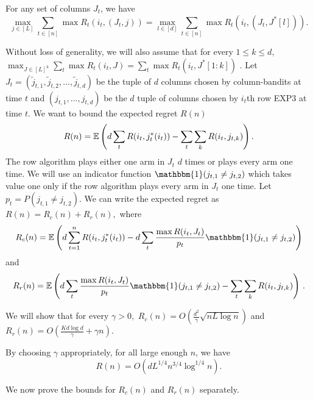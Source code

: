 \begin{lemma}
\label{thm:hott}
For any set of columns $J_t$, we have 
$$ \max_{j \in [L]} \sum_{t \in [n]} \max R_t(i_t, (J_t,j)) = \max_{l \in [d]} \sum_{t \in [n]} \max R_t(i_t, (J_t,J^*[l])).$$
\end{lemma}
Without loss of generality, we will also assume that for every $1 \leq k \leq d,$ $\max_{J \in [L]^k} \sum_t \max R_t(i_t,J) = \sum_t \max R_t(i_t,J^*[1:k])$ .  Let $J_t = (\tilde{j}_{t,1},\tilde{j}_{t,2},...,\tilde{j}_{t,d})$ be the tuple of $d$ columns chosen by column-bandits at time $t$ and $(j_{t,1},...,j_{t,d})$ be the $d$ tuple of columns chosen by $i_t$th row EXP3 at time $t.$ We want to bound the expected regret $R(n)$  
$$R(n) = \mathbb{E} \left( d\sum_{t } R(i_t,j^*_t(i_t)) - \sum_{t} \sum_k R(i_t,j_{t,k}) \right).$$
 The row algorithm plays either one arm in $J_t$ $d$ times or plays every arm one time. We will use an indicator function $\mathbbm{1}(j_{t,1} \neq j_{t,2})$ which takes value one only if the row algorithm  plays every arm in $J_t$ one time. Let $p_t = P(j_{t, 1} \neq j_{t, 2})$. We can write the expected regret as 
$R(n) = R_c(n) + R_r(n),$ where
\begin{align*}
  R_c(n) = \E \left( d\sum_{t = 1}^{n} R(i_t,j^*_t(i_t)) - d\sum_{t} \frac{\max R(i_t,J_t)}{p_t} \mathbbm{1}(j_{t,1} \neq j_{t,2})  \right)
\end{align*}
and
\begin{align*}
  R_r(n) = \E \left( d \sum_{t} \frac{ \max R(i_t,J_t)}{p_t} \mathbbm{1}(j_{t,1} \neq j_{t,2}) - \sum_{t} \sum_k R(i_t,j_{t,k}) \right)\,.
\end{align*}
  
We will show that for every $\gamma > 0,$   
$R_c(n) =  O \left( \frac{d^2}{\gamma} \sqrt {n L \log n} \right)$
and $R_r(n) =O \left( \frac{K d\log d}{\gamma} + \gamma n  \right) .$ 
\begin{theorem}
By choosing $\gamma$ appropriately, for all large enough $n$, we have 
$$R(n) = O\left( d L^{1/4} n^{3/4} \log^{1/4} n\right) .$$
\end{theorem}
We now prove the bounds for $R_c(n)$ and $R_r(n)$ separately.

